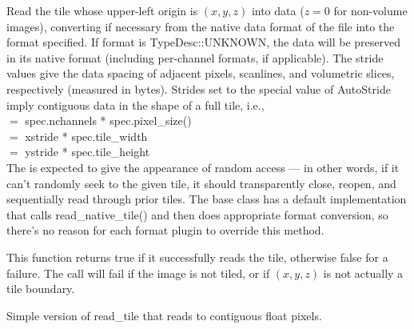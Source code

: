 Read the tile whose upper-left origin is $(x,y,z)$ into {\kw data}
($z=0$ for non-volume images),
converting if necessary from the native data format of the file into the 
{\kw format} specified.
If {\cf format} is {\cf TypeDesc::UNKNOWN}, the data will be preserved 
in its native format (including per-channel formats, if applicable).
The stride values
give the data spacing of adjacent pixels, scanlines, and volumetric
slices, respectively (measured in bytes).  Strides set to the special
value of {\kw AutoStride} imply contiguous data in the shape of a full tile,
i.e., \\
 $=$ {\kw spec.nchannels * spec.pixel_size()} \\
 $=$ {\kw xstride * spec.tile_width} \\
 $=$ {\kw ystride * spec.tile_height} \\
The \ImageInput is expected to give the appearance of random access
--- in other words, if it can't randomly seek to the given tile, it
should transparently close, reopen, and sequentially read through prior
tiles.  The base \ImageInput class has a default implementation
that calls {\cf read_native_tile()} and then does appropriate format conversion,
so there's no reason for each format plugin to override this method.

This function returns {\cf true} if it successfully reads the tile,
otherwise {\cf false} for a failure.
The call will fail if the image is not tiled, or if $(x,y,z)$ is not
actually a tile boundary.
\apiend


Simple version of {\kw read_tile} that reads to contiguous float pixels.
\apiend


